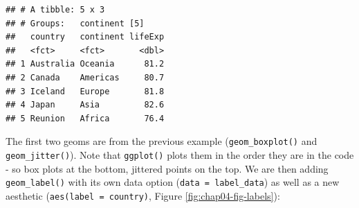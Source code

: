 \documentclass[
  12pt,
  krantz2]{krantz}
\makeatletter
\newenvironment{Shaded}{\begin{snugshade}}{\end{snugshade}}
\newcommand{\CommentTok}[1]{\textcolor[rgb]{0.56,0.35,0.01}{\textit{#1}}}
\newcommand{\DataTypeTok}[1]{\textcolor[rgb]{0.13,0.29,0.53}{#1}}
\newcommand{\KeywordTok}[1]{\textcolor[rgb]{0.13,0.29,0.53}{\textbf{#1}}}
\newcommand{\NormalTok}[1]{#1}
\newcommand{\OperatorTok}[1]{\textcolor[rgb]{0.81,0.36,0.00}{\textbf{#1}}}
\newcommand{\StringTok}[1]{\textcolor[rgb]{0.31,0.60,0.02}{#1}}
\newenvironment{kframe}{%
\medskip{}
\setlength{\fboxsep}{.8em}
 \def\at@end@of@kframe{}%
 \ifinner\ifhmode%
  \def\at@end@of@kframe{\end{minipage}}%
  \begin{minipage}{\columnwidth}%
 \fi\fi%
 \def\FrameCommand##1{\hskip\@totalleftmargin \hskip-\fboxsep
 \colorbox{shadecolor}{##1}\hskip-\fboxsep
     \hskip-\linewidth \hskip-\@totalleftmargin \hskip\columnwidth}%
 \MakeFramed {\advance\hsize-\width
   \@totalleftmargin\z@ \linewidth\hsize
   \@setminipage}}%
 {\par\unskip\endMakeFramed%
 \at@end@of@kframe}
\renewenvironment{Shaded}{\begin{kframe}}{\end{kframe}}
\makeatother
\begin{document}
\begin{Shaded}
\end{Shaded}

\begin{verbatim}
## # A tibble: 5 x 3
## # Groups:   continent [5]
##   country   continent lifeExp
##   <fct>     <fct>       <dbl>
## 1 Australia Oceania      81.2
## 2 Canada    Americas     80.7
## 3 Iceland   Europe       81.8
## 4 Japan     Asia         82.6
## 5 Reunion   Africa       76.4
\end{verbatim}

The first two geoms are from the previous example (\texttt{geom\_boxplot()} and \texttt{geom\_jitter()}).
Note that \texttt{ggplot()} plots them in the order they are in the code - so box plots at the bottom, jittered points on the top.
We are then adding \texttt{geom\_label()} with its own data option (\texttt{data\ =\ label\_data}) as well as a new aesthetic (\texttt{aes(label\ =\ country)}, Figure \ref{fig:chap04-fig-labels}):

\begin{Shaded}
\end{Shaded}
\end{document}
